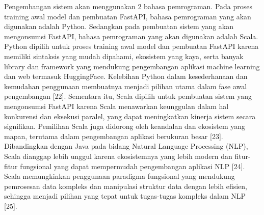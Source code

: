 Pengembangan sistem akan menggunakan 2 bahasa pemrograman. Pada proses training awal model dan pembuatan FastAPI, bahasa pemrograman yang akan digunakan adalah Python. Sedangkan pada pembuatan sistem yang akan mengonsumsi FastAPI, bahasa pemrograman yang akan digunakan adalah Scala. Python dipilih untuk proses training awal model dan pembuatan FastAPI karena memiliki sintaksis yang mudah dipahami, ekosistem yang kaya, serta banyak library dan framework yang mendukung pengembangan aplikasi machine learning dan web termasuk HuggingFace. Kelebihan Python dalam kesederhanaan dan kemudahan penggunaan membuatnya menjadi pilihan utama dalam fase awal pengembangan [22]. Sementara itu, Scala dipilih untuk pembuatan sistem yang mengonsumsi FastAPI karena Scala menawarkan keunggulan dalam hal konkurensi dan eksekusi paralel, yang dapat meningkatkan kinerja sistem secara signifikan. Pemilihan Scala juga didorong oleh keandalan dan ekosistem yang mapan, terutama dalam pengembangan aplikasi berukuran besar [23]. Dibandingkan dengan Java pada bidang Natural Language Processing (NLP), Scala dianggap lebih unggul karena ekosistemnya yang lebih modern dan fitur-fitur fungsional yang dapat mempermudah pengembangan aplikasi NLP [24]. Scala memungkinkan penggunaan paradigma fungsional yang mendukung pemrosesan data kompleks dan manipulasi struktur data dengan lebih efisien, sehingga menjadi pilihan yang tepat untuk tugas-tugas kompleks dalam NLP [25].
